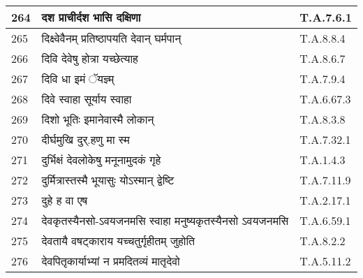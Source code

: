 \documentclass[17pt]{extarticle}
\begin{document}
\begin{longtable}{||p{0.4in}||p{4.9in}||p{0.9in}||}
    \hline
        
    264 & दश प्राचीर्दश भासि दक्षिणा & T.A.7.6.1       \\
    
    \hline
        
    265 & दिक्ष्वेवैनम् प्रतिष्ठापयति देवान् घर्मपान् & T.A.8.8.4       \\
    
    \hline
        
    266 & दिवि देवेषु होत्रा यच्छेत्याह & T.A.8.6.7       \\
    
    \hline
        
    267 & दिवि धा इमं ॅयज्ञ्म् & T.A.7.9.4       \\
    
    \hline
        
    268 & दिवे स्वाहा सूर्याय स्वाहा & T.A.6.67.3       \\
    
    \hline
        
    269 & दिशो भूतिः इमानेवास्मै लोकान् & T.A.8.3.8       \\
    
    \hline
        
    270 & दीर्घमुखि दुर्.हणु मा स्म & T.A.7.32.1       \\
    
    \hline
        
    271 & दुर्भिक्षं देवलोकेषु मनूनामुदकं गृहे & T.A.1.4.3       \\
    
    \hline
        
    272 & दुर्मित्रास्तस्मै भूयासुः योऽस्मान् द्वेष्टि & T.A.7.11.9       \\
    
    \hline
        
    273 & दुहे ह वा एष & T.A.2.17.1       \\
    
    \hline
        
    274 & देवकृतस्यैनसो{-}ऽवयजनमसि स्वाहा मनुष्यकृतस्यैनसो ऽवयजनमसि & T.A.6.59.1       \\
    
    \hline
        
    275 & देवतायै वषट्काराय यच्चतुर्गृहीतम् जुहोति & T.A.8.2.2       \\
    
    \hline
        
    276 & देवपितृकार्याभ्यां न प्रमदितव्यं मातृदेवो & T.A.5.11.2       \\
    

\end{longtable}
\end{document}
